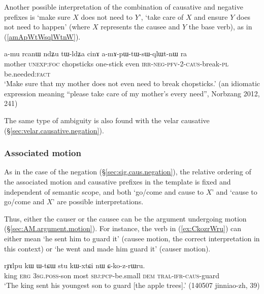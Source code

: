 
Another possible interpretation of the combination of causative and negative prefixes is `make sure $X$ does not need to $Y$', `take care of $X$ and ensure $Y$ does not need to happen' (where $X$ represents the causee and $Y$ the base verb), as in (\ref{amApWtWsqlWtnW}).

\begin{exe}
\ex \label{amApWtWsqlWtnW}
\gll   a-mu rcanɯ ndʑu tɯ-ldʑa cinɤ  a-mɤ-pɯ-tɯ-sɯ-qlɯt-nɯ ra \\
 mother \textsc{unexp}:\textsc{foc} chopsticks one-stick even  \textsc{irr}-\textsc{neg}-\textsc{pfv}-2-\textsc{caus}-break-\textsc{pl} be.needed:\textsc{fact} \\
 \glt   `Make sure that my mother does not even need to break chopsticks.' (an idiomatic expression meaning ``please take care of my mother's every need'', Norbzang 2012, 241)
\end{exe}

The same type of ambiguity is also found with the velar causative (§\ref{sec:velar.causative.negation}).

\subsubsection{Associated motion} \label{sec:sig.caus.AM} 
As in the case of the negation (§\ref{sec:sig.caus.negation}), the relative ordering of the associated motion and causative prefixes in the template is fixed and independent of semantic scope, and both  `go/come and cause to $X$' and `cause to go/come and $X$' are possible interpretations.

Thus, either the causer or the causee can be the argument undergoing motion (§\ref{sec:AM.argument.motion}). For instance, the verb  in (\ref{ex:CkozrWru}) can either mean `he sent him to guard it' (causee motion, the correct interpretation in this context) or `he went and made him guard it' (causer motion).

\begin{exe}
\ex \label{ex:CkozrWru}
\gll rɟɤlpu kɯ ɯ-tɕɯ stu kɯ-xtɕi nɯ ɕ-ko-z-rɯru. \\
king \textsc{erg} \textsc{3sg}.\textsc{poss}-son most \textsc{sbj}:\textsc{pcp}-be.small \textsc{dem} \textsc{tral}-\textsc{ifr}-\textsc{caus}-guard \\
\glt `The king sent his youngest son to guard [the apple trees].' (140507 jinniao-zh, 39)
\end{exe}


